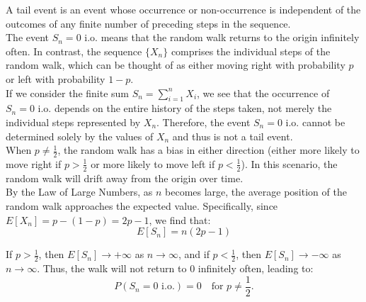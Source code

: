 \begin{solution}
 A tail event is an event whose occurrence or non-occurrence is independent of the outcomes of any finite number of preceding steps in the sequence. \\
 
 The event \(S_n = 0 \text{ i.o.}\) means that the random walk returns to the origin infinitely often. In contrast, the sequence $\{X_n\}$ comprises the individual steps of the random walk, which can be thought of as either moving right with probability \(p\) or left with probability \(1-p\).\\
 
    If we consider the finite sum \(S_n = \sum_{i=1}^n X_i\), we see that the occurrence of \(S_n = 0 \text{ i.o.}\) depends on the entire history of the steps taken, not merely the individual steps represented by \(X_n\). Therefore, the event \(S_n = 0 \text{ i.o.}\) cannot be determined solely by the values of \(X_n\) and thus is not a tail event.\\
 
    When \(p \neq \frac{1}{2}\), the random walk has a bias in either direction (either more likely to move right if \(p > \frac{1}{2}\) or more likely to move left if \(p < \frac{1}{2}\)). In this scenario, the random walk will drift away from the origin over time.\\
 
    By the Law of Large Numbers, as \(n\) becomes large, the average position of the random walk approaches the expected value. Specifically, since \(E[X_n] = p - (1 - p) = 2p - 1\), we find that:
    \[
    E[S_n] = n(2p - 1)
    \]
 
    If \(p > \frac{1}{2}\), then \(E[S_n] \to +\infty\) as \(n \to \infty\), and if \(p < \frac{1}{2}\), then \(E[S_n] \to -\infty\) as \(n \to \infty\). Thus, the walk will not return to \(0\) infinitely often, leading to:
    \[
    P(S_n = 0 \text{ i.o.}) = 0 \quad \text{for } p \neq \frac{1}{2}.
    \]
\end{solution}